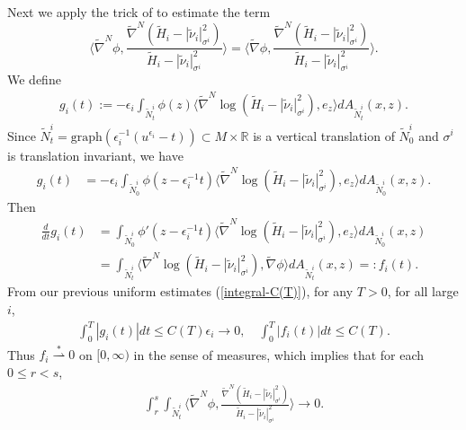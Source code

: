 \documentclass[11pt, letterpaper]{amsart}
\theoremstyle{definition}
\theoremstyle{remark}
\def\WL{\overset{\ast}{\rightharpoonup}}
\begin{document}
Next we apply the trick of \cite[Lemma 5.3]{HI01} to estimate the term 
$$\langle \tilde{\nabla} ^{N} \phi , \frac{\tilde{\nabla} ^{N}(\tilde{H}_i-|\tilde{\nu}_i |^2_{\sigma^{i} })}{\tilde{H}_i- |\tilde{\nu}_i |^2_{\sigma ^{i} }} \rangle = \langle \tilde{\nabla} \phi , \frac{\tilde{\nabla} ^{N}(\tilde{H}_i-|\tilde{\nu}_i |^2_{\sigma^{i} })}{\tilde{H}_i- |\tilde{\nu}_i |^2_{\sigma ^{i} }} \rangle .$$
We define
 \begin{align*}
	g_i(t):= - \epsilon _i \int_{\tilde{N}^{i}_t} \phi (z) \langle \tilde{\nabla }^{N}\log (\tilde{H}_{i} - |\tilde{\nu }_{i}|^2_{\sigma ^{i}}), e_z \rangle d A_{\tilde{N}^{i}_t}(x,z).
\end{align*} 
Since $\tilde{N}^{i}_{t} = \mathrm{graph}\left( \epsilon _i ^{-1}(u ^{\epsilon _i} - t) \right) \subset M \times \mathbb{R}$ is a vertical translation of $\tilde{N}^{i}_{0}$ and $\sigma ^{i}$ is translation invariant, we have
\begin{align*}
	g_i(t) &= - \epsilon _i \int_{\tilde{N}^{i}_{0}} \phi (z - \epsilon _i ^{-1} t)  \langle \tilde{\nabla }^{N}\log (\tilde{H}_{i} - |\tilde{\nu }_{i}|^2_{\sigma ^{i}}), e_z \rangle d A_{\tilde{N}^{i}_{0}}(x,z).
\end{align*} 
Then
\begin{align*}
	\frac{d}{d t} g_i(t) &= \int_{\tilde{N}^{i}_{0}} \phi' (z - \epsilon _i ^{-1} t)  \langle \tilde{\nabla }^{N}\log (\tilde{H}_{i} - |\tilde{\nu }_{i}|^2_{\sigma ^{i}}), e_z \rangle d A_{\tilde{N}^{i}_{0}}(x,z) \\
			     &= \int_{\tilde{N}^{i}_t} \langle \tilde{\nabla }^{N}\log (\tilde{H}_{i} - |\tilde{\nu }_{i}|^2_{\sigma ^{i}}), \tilde{\nabla } \phi  \rangle d A_{\tilde{N}^{i}_t}(x,z) =: f_i(t).
\end{align*} 
From our previous uniform estimates (\ref{integral-C(T)}), for any $T>0$, for all large $i$,
\begin{align*}
	\int_{0}^{T} |g_i(t)| dt \leq C(T) \epsilon _i \to 0,\quad \int_{0}^{T}|f_i(t)| dt \leq C(T).
\end{align*} 
Thus $f_i \WL 0$ on $[0, \infty)$ in the sense of measures, which implies that for each $0 \leq r<s$,
\begin{align*}
	\int_{r}^{s} \int_{\tilde{N}^{i}_t} \langle \tilde{\nabla} ^{N} \phi , \frac{\tilde{\nabla} ^{N}(\tilde{H}_i-|\tilde{\nu}_i |^2_{\sigma^{i} })}{\tilde{H}_i- |\tilde{\nu}_i |^2_{\sigma ^{i} }} \rangle \to 0.
\end{align*} 
\end{document}
